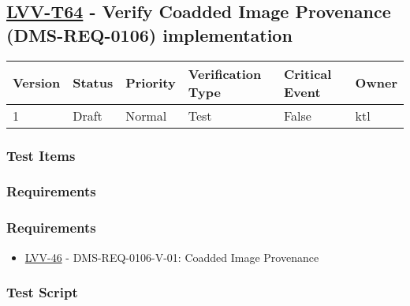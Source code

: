 \hypertarget{lvv-t64---verify-coadded-image-provenance-dms-req-0106-implementation}{%
\subsection{\texorpdfstring{\href{https://jira.lsstcorp.org/secure/Tests.jspa\#/testCase/LVV-T64}{LVV-T64}
- Verify Coadded Image Provenance (DMS-REQ-0106)
implementation}{LVV-T64 - Verify Coadded Image Provenance (DMS-REQ-0106) implementation}}\label{lvv-t64---verify-coadded-image-provenance-dms-req-0106-implementation}}

\begin{longtable}[]{@{}llllll@{}}
\toprule
Version & Status & Priority & Verification Type & Critical Event &
Owner\tabularnewline
\midrule
\endhead
1 & Draft & Normal & Test & False & ktl\tabularnewline
\bottomrule
\end{longtable}

\hypertarget{test-items-3}{%
\subsubsection{Test Items}\label{test-items-3}}

\hypertarget{requirements-6}{%
\subsubsection{Requirements}\label{requirements-6}}

\hypertarget{requirements-7}{%
\subsubsection{Requirements}\label{requirements-7}}

\begin{itemize}
\tightlist
\item
  \href{https://jira.lsstcorp.org/browse/LVV-46}{LVV-46} -
  DMS-REQ-0106-V-01: Coadded Image Provenance
\end{itemize}

\hypertarget{test-script-3}{%
\subsubsection{Test Script}\label{test-script-3}}

